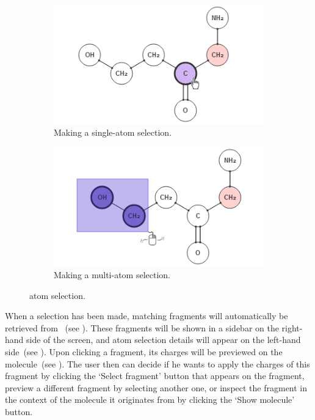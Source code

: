 \begin{figure}
\centering
\begin{subfigure}[t]{0.45\textwidth}
\centering
\includegraphics[width=\textwidth]{img/select_1.png}
\caption{Making a single-atom selection.}
\end{subfigure}%
\qquad
\begin{subfigure}[t]{0.45\textwidth}
\centering
\includegraphics[width=\textwidth]{img/select_2.png}
\caption{Making a multi-atom selection.}
\end{subfigure}
\caption{\oframp{} atom selection.}
\end{figure}

When a selection has been made, matching fragments will automatically be retrieved from \omfraf~(see ). These fragments will be shown in a sidebar on the right-hand side of the screen, and atom selection details will appear on the left-hand side~(see ). Upon clicking a fragment, its charges will be previewed on the molecule~(see ). The user then can decide if he wants to apply the charges of this fragment by clicking the `Select fragment' button that appears on the fragment, preview a different fragment by selecting another one, or inspect the fragment in the context of the molecule it originates from by clicking the `Show molecule' button.

